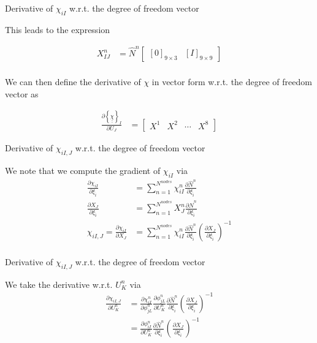\documentclass[11pt]{beamer}
\newcommand{\TEN}[1]{\underline{\underline{#1}}}
\begin{document}
\begin{frame}{Derivative of $\chi_{iI}$ w.r.t. the degree of freedom vector}

This leads to the expression

\begin{align*}
X_{IJ}^n &= \hat{N}^n\left[\begin{array}{cc}
\left[0\right]_{9\times 3} & \left[I\right]_{9 \times 9}
\end{array} \right]\\
\end{align*}

We can then define the derivative of $\chi$ in vector form w.r.t. the degree of freedom vector as

\begin{align*}
\frac{\partial \left\{\TEN{\chi}\right\}_I}{\partial U_{J}} &= \left[\begin{array}{cccc}
X^1 & X^2 & \cdots & X^8
\end{array}\right]
\end{align*}

\end{frame}

\begin{frame}{Derivative of $\chi_{iI,J}$ w.r.t. the degree of freedom vector}

We note that we compute the gradient of $\chi_{iI}$ via
\begin{align*}
\frac{\partial \chi_{iI}}{\partial \xi_{\hat{i}}} &= \sum_{n=1}^{N^{nodes}} \chi_{iI}^n \frac{\partial \hat{N}^n}{\partial \xi_{\hat{i}}}\\
\frac{\partial X_J}{\partial \xi_{\hat{i}}} &= \sum_{n=1}^{N^{nodes}} X_J^n \frac{\partial \hat{N}^n}{\partial \xi_{\hat{i}}}\\
\chi_{iI,J} = \frac{\partial \chi_{iI}}{\partial X_J} &= \sum_{n=1}^{N^{nodes}} \chi_{iI}^n \frac{\partial \hat{N}^n}{\partial \xi_{\hat{i}}}\left(\frac{\partial X_J}{\partial \xi_{\hat{i}}}\right)^{-1}\\
\end{align*}

\end{frame}

\begin{frame}{Derivative of $\chi_{iI,J}$ w.r.t. the degree of freedom vector}

We take the derivative w.r.t. $U_K^n$ via
\begin{align*}
\frac{\partial \chi_{iI,J}}{\partial U_K^n} &=  \frac{\partial \chi_{iI}^n}{\partial \phi_{jL}^n} \frac{\partial \phi_{jL}^n}{\partial U_K^n} \frac{\partial \hat{N}^n}{\partial \xi_{\hat{i}}}\left(\frac{\partial X_J}{\partial \xi_{\hat{i}}}\right)^{-1}\\
&= \frac{\partial \phi_{iI}^n}{\partial U_K^n} \frac{\partial \hat{N}^n}{\partial \xi_{\hat{i}}}\left(\frac{\partial X_J}{\partial \xi_{\hat{i}}}\right)^{-1}\\
\end{align*}

\end{frame}
\end{document}
